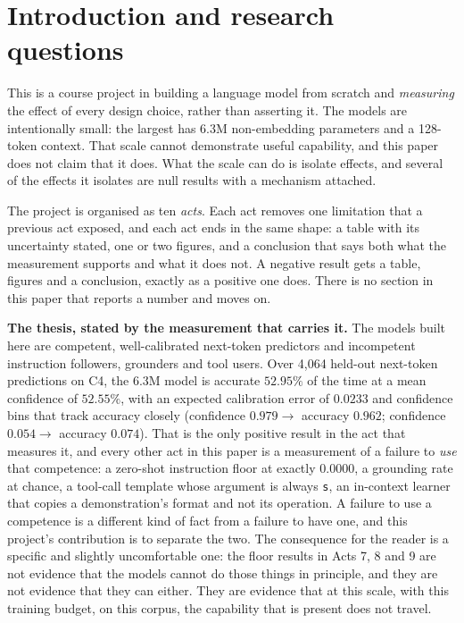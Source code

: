 \documentclass[11pt,a4paper]{article}
\begin{document}
\section{Introduction and research questions}
\label{sec:intro}

This is a course project in building a language model from scratch and
\emph{measuring} the effect of every design choice, rather than asserting it.
The models are intentionally small: the largest has 6.3M non-embedding
parameters and a 128-token context. That scale cannot demonstrate useful
capability, and this paper does not claim that it does. What the scale can do
is isolate effects, and several of the effects it isolates are null results with
a mechanism attached.

The project is organised as ten \emph{acts}. Each act removes one limitation
that a previous act exposed, and each act ends in the same shape: a table with
its uncertainty stated, one or two figures, and a conclusion that says both what
the measurement supports and what it does not. A negative result gets a table,
figures and a conclusion, exactly as a positive one does. There is no section
in this paper that reports a number and moves on.

\textbf{The thesis, stated by the measurement that carries it.} The models
built here are competent, well-calibrated next-token predictors and
incompetent instruction followers, grounders and tool users. Over 4,064
held-out next-token predictions on C4, the 6.3M model is accurate $52.95\%$ of
the time at a mean confidence of $52.55\%$, with an expected calibration error
of $0.0233$ and confidence bins that track accuracy closely (confidence
$0.979 \rightarrow$ accuracy $0.962$; confidence $0.054 \rightarrow$ accuracy
$0.074$). That is the only positive result in the act that measures it, and
every other act in this paper is a measurement of a failure to \emph{use} that
competence: a zero-shot instruction floor at exactly 0.0000, a grounding rate
at chance, a tool-call template whose argument is always \texttt{s}, an
in-context learner that copies a demonstration's format and not its operation.
A failure to use a competence is a different kind of fact from a failure to
have one, and this project's contribution is to separate the two. The
consequence for the reader is a specific and slightly uncomfortable one: the
floor results in Acts 7, 8 and 9 are not evidence that the models cannot do
those things in principle, and they are not evidence that they can either.
They are evidence that at this scale, with this training budget, on this
corpus, the capability that is present does not travel. %
\end{document}

